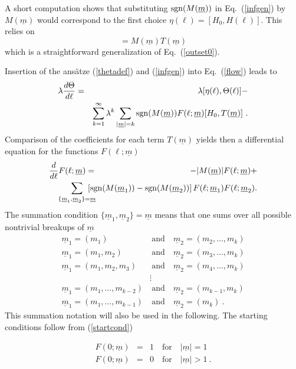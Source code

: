A short computation shows that substituting ${\rm sgn}(M(\underline{m}))$
in Eq.~(\ref{infgen}) by $M(\underline{m})$ would correspond to the first
 choice $\eta(\ell) =[H_0,H(\ell)]$. This relies on 
\begin{equation}
[H_0,T(\underline{m})] = M(\underline{m})T(\underline{m})
\label{kommut-m}
\end{equation}
which is a straightforward generalization of Eq.~(\ref{outset0}). 

Insertion of the ans\"atze (\ref{thetadef}) and (\ref{infgen}) 
into Eq.~(\ref{flow}) leads to
\begin{eqnarray}\nonumber
\lambda\frac{d\Theta}{d\ell} &=& \lambda[\eta(\ell),\Theta(\ell)]
-\\
&&  \sum_{k=1}^\infty \lambda^k
\sum_{|\underline{m}| = k} 
{\rm sgn}(M(\underline{m}))F(\ell;\underline{m}) [H_0,T(\underline{m})]\ .
\end{eqnarray}
Comparison of the coefficients for each term $T(\underline{m})$
yields then a differential equation for the functions 
$F(\ell;\underline{m})$
\begin{eqnarray}\label{dgl}
\frac{d}{d\ell}F(\ell;\underline{m}) &=& -|M(\underline{m})|  
F(\ell;\underline{m})+  \\\nonumber
&& \hspace{-19mm}\sum_{\{ \underline{m}_1,\underline{m}_2\}
=\underline{m}} \hspace{-4mm} \left[{\rm sgn}(M(\underline{m}_1)) -
{\rm sgn}(M(\underline{m}_2))  \right]
F(\ell;\underline{m}_1)
F(\ell;\underline{m}_2).
\end{eqnarray}
The summation condition $\{ \underline{m}_1,\underline{m}_2\}=\underline{m}$
means that one sums over all possible nontrivial breakups of $\underline{m}$
\begin{eqnarray}\nonumber
\underline{m}_1 =(m_1) &\ \mbox{and}\ & 
\underline{m}_2 =(m_2,\ldots,m_k)\\\nonumber
\underline{m}_1 =(m_1,m_2) &\ \mbox{and}\ & 
\underline{m}_2 =(m_3,\ldots,m_k)\\\nonumber
\underline{m}_1 =(m_1,m_2,m_3) &\ \mbox{and}\ & 
\underline{m}_2 =(m_4,\ldots,m_k)\\\nonumber
&\vdots&\\\nonumber
\underline{m}_1 =(m_1,\ldots,m_{k-2}) &\ \mbox{and}\ & 
\underline{m}_2 =(m_{k-1},m_k)\\
\underline{m}_1 =(m_1,\ldots,m_{k-1}) &\ \mbox{and}\ & 
\underline{m}_2 =(m_k)\ .\label{breakups}
\end{eqnarray}
This summation notation will also be used in the following.
The starting conditions follow from (\ref{startcond})
\begin{mathletters}
\label{startcond2}
\begin{eqnarray}
F(0;\underline{m}) &=& 1 \quad \mbox{for} \quad |\underline{m}|=1\\
F(0;\underline{m}) &=& 0 \quad \mbox{for} \quad |\underline{m}|>1\ .
\end{eqnarray}
\end{mathletters}

